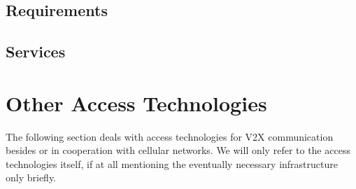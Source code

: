 \documentclass[conference,12pt,onecolumn]{IEEEtran}
\begin{document}
\subsection{Requirements}


\subsection{Services}

\section{Other Access Technologies}
The following section deals with access technologies for V2X communication besides or in cooperation with cellular networks. We will only refer to the access technologies itself, if at all mentioning the eventually necessary infrastructure only briefly.
\end{document}
